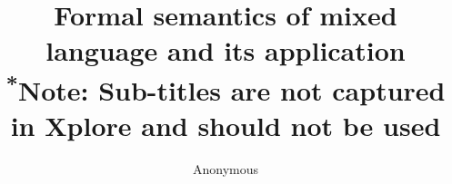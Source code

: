 \documentclass[conference]{IEEEtran}
\begin{document}
\title{Formal semantics of mixed language and its application\\
{\footnotesize \textsuperscript{*}Note: Sub-titles are not captured in Xplore and
should not be used}
}
\author{Anonymous}

\maketitle
\end{document}
